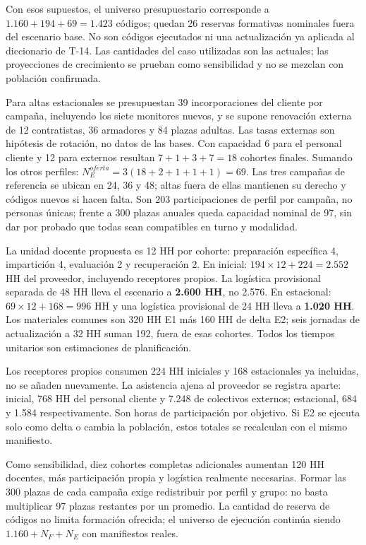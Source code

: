 Con esos supuestos, el universo presupuestario corresponde a $1.160+194+69=1.423$ códigos; quedan 26 reservas formativas nominales fuera del escenario base. No son códigos ejecutados ni una actualización ya aplicada al diccionario de T-14. Las cantidades del caso utilizadas son las actuales; las proyecciones de crecimiento se prueban como sensibilidad y no se mezclan con población confirmada.

Para altas estacionales se presupuestan 39 incorporaciones del cliente por campaña, incluyendo los siete monitores nuevos, y se supone renovación externa de 12 contratistas, 36 armadores y 84 plazas adultas. Las tasas externas son hipótesis de rotación, no datos de las bases. Con capacidad 6 para el personal cliente y 12 para externos resultan $7+1+3+7=18$ cohortes finales. Sumando los otros perfiles: $N_E^{oferta}=3(18+2+1+1+1)=69$. Las tres campañas de referencia se ubican en 24, 36 y 48; altas fuera de ellas mantienen su derecho y códigos nuevos si hacen falta. Son 203 participaciones de perfil por campaña, no personas únicas; frente a 300 plazas anuales queda capacidad nominal de 97, sin dar por probado que todas sean compatibles en turno y modalidad.

La unidad docente propuesta es 12 HH por cohorte: preparación específica 4, impartición 4, evaluación 2 y recuperación 2. En inicial: $194\times12+224=2.552$ HH del proveedor, incluyendo receptores propios. La logística provisional separada de 48 HH lleva el escenario a \textbf{2.600 HH}, no 2.576. En estacional: $69\times12+168=996$ HH y una logística provisional de 24 HH lleva a \textbf{1.020 HH}. Los materiales comunes son 320 HH E1 más 160 HH de delta E2; seis jornadas de actualización a 32 HH suman 192, fuera de esas cohortes. Todos los tiempos unitarios son estimaciones de planificación.

Los receptores propios consumen 224 HH iniciales y 168 estacionales ya incluidas, no se añaden nuevamente. La asistencia ajena al proveedor se registra aparte: inicial, 768 HH del personal cliente y 7.248 de colectivos externos; estacional, 684 y 1.584 respectivamente. Son horas de participación por objetivo. Si E2 se ejecuta solo como delta o cambia la población, estos totales se recalculan con el mismo manifiesto.

Como sensibilidad, diez cohortes completas adicionales aumentan 120 HH docentes, más participación propia y logística realmente necesarias. Formar las 300 plazas de cada campaña exige redistribuir por perfil y grupo: no basta multiplicar 97 plazas restantes por un promedio. La cantidad de reserva de códigos no limita formación ofrecida; el universo de ejecución continúa siendo $1.160+N_F+N_E$ con manifiestos reales.

